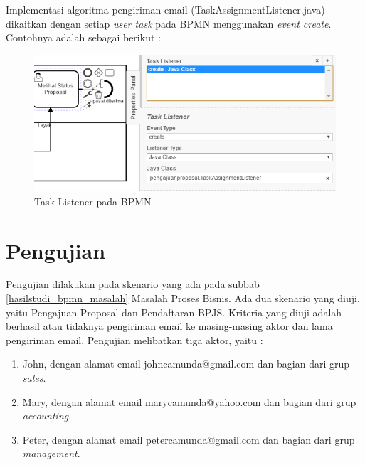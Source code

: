 Implementasi algoritma pengiriman email (TaskAssignmentListener.java) dikaitkan dengan setiap \textit{user task} pada BPMN menggunakan \textit{event create}. Contohnya adalah sebagai berikut :
	\begin{figure}[H]
			\centering
			\includegraphics[scale=0.8]{Gambar/Bab-5/taskListener}
			\caption{Task Listener pada BPMN} 
			\label{fig:pengujian_taskListener}
	\end{figure}




\section{Pengujian}
\label{sec:pengujian}
Pengujian dilakukan pada skenario yang ada pada subbab \ref{hasilstudi_bpmn_masalah} Masalah Proses Bisnis. Ada dua skenario yang diuji, yaitu Pengajuan Proposal dan Pendaftaran BPJS. Kriteria yang diuji adalah berhasil atau tidaknya pengiriman email ke masing-masing aktor dan lama pengiriman email. Pengujian melibatkan tiga aktor, yaitu : 
\begin{enumerate}
	\item John, dengan alamat email johncamunda@gmail.com dan bagian dari grup \textit{sales}.
	\item Mary, dengan alamat email marycamunda@yahoo.com dan bagian dari grup \textit{accounting}.
	\item Peter, dengan alamat email petercamunda@gmail.com dan bagian dari grup \textit{management}.
\end{enumerate}



